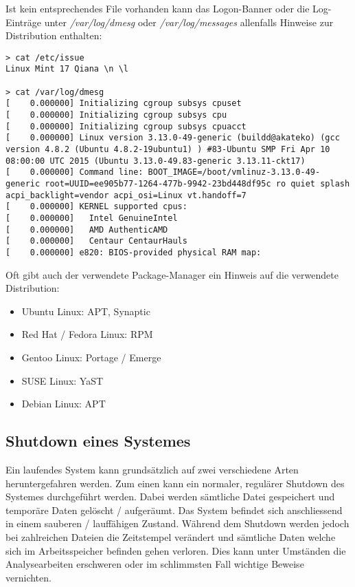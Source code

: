 Ist kein entsprechendes File vorhanden kann das Logon-Banner oder die Log-Einträge unter \textit{/var/log/dmesg} oder \textit{/var/log/messages} allenfalls Hinweise zur Distribution enthalten:\\
\begin{lstlisting}
> cat /etc/issue
Linux Mint 17 Qiana \n \l

> cat /var/log/dmesg
[    0.000000] Initializing cgroup subsys cpuset
[    0.000000] Initializing cgroup subsys cpu
[    0.000000] Initializing cgroup subsys cpuacct
[    0.000000] Linux version 3.13.0-49-generic (buildd@akateko) (gcc version 4.8.2 (Ubuntu 4.8.2-19ubuntu1) ) #83-Ubuntu SMP Fri Apr 10 08:00:00 UTC 2015 (Ubuntu 3.13.0-49.83-generic 3.13.11-ckt17)
[    0.000000] Command line: BOOT_IMAGE=/boot/vmlinuz-3.13.0-49-generic root=UUID=ee905b77-1264-477b-9942-23bd448df95c ro quiet splash acpi_backlight=vendor acpi_osi=Linux vt.handoff=7
[    0.000000] KERNEL supported cpus:
[    0.000000]   Intel GenuineIntel
[    0.000000]   AMD AuthenticAMD
[    0.000000]   Centaur CentaurHauls
[    0.000000] e820: BIOS-provided physical RAM map:
\end{lstlisting}

Oft gibt auch der verwendete Package-Manager ein Hinweis auf die verwendete Distribution:\\
\begin{itemize}
\item Ubuntu Linux: APT, Synaptic
\item Red Hat / Fedora Linux: RPM
\item Gentoo Linux: Portage / Emerge
\item SUSE Linux: YaST
\item Debian Linux: APT
\end{itemize}



\subsection{Shutdown eines Systemes}
Ein laufendes System kann grundsätzlich auf zwei verschiedene Arten heruntergefahren werden. Zum einen kann ein normaler, regulärer Shutdown des Systemes durchgeführt werden. Dabei werden sämtliche Datei gespeichert und temporäre Daten gelöscht / aufgeräumt. Das System befindet sich anschliessend in einem sauberen / lauffähigen Zustand. Während dem Shutdown werden jedoch bei zahlreichen Dateien die Zeitstempel verändert und sämtliche Daten welche sich im Arbeitsspeicher befinden gehen verloren. Dies kann unter Umständen die Analysearbeiten erschweren oder im schlimmsten Fall wichtige Beweise vernichten.


